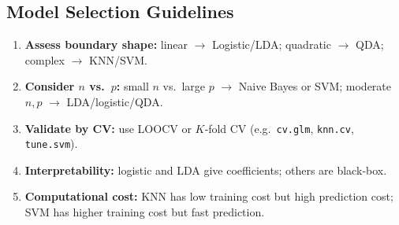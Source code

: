 \documentclass{article}
\begin{document}
\subsection{Model Selection Guidelines}
\begin{enumerate}[label=\arabic*.]
  \item \textbf{Assess boundary shape:} 
    linear $\to$ Logistic/LDA; quadratic $\to$ QDA; complex $\to$ KNN/SVM.
  \item \textbf{Consider $n$ vs.\ $p$:} 
    small $n$ vs.\ large $p$ $\to$ Naive Bayes or SVM; moderate $n,p$ $\to$ LDA/logistic/QDA.
  \item \textbf{Validate by CV:} 
    use LOOCV or $K$‐fold CV (e.g.\ \texttt{cv.glm}, \texttt{knn.cv}, \texttt{tune.svm}).
  \item \textbf{Interpretability:} 
    logistic and LDA give coefficients; others are black‐box.
  \item \textbf{Computational cost:} 
    KNN has low training cost but high prediction cost; SVM has higher training cost but fast prediction.
\end{enumerate}



\pagebreak


\end{document}
